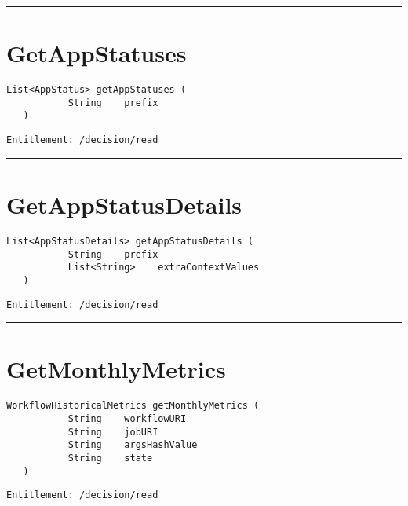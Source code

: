 \rule{12cm}{2pt}
\section{GetAppStatuses}
\label{Api:GetAppStatuses}
\begin{lstlisting}[style=nonumbers]
   List<AppStatus> getAppStatuses (
           String    prefix
   )
\end{lstlisting}
\begin{Verbatim}[formatcom=\color{Maroon}]
  Entitlement: /decision/read
\end{Verbatim}



\rule{12cm}{2pt}
\section{GetAppStatusDetails}
\label{Api:GetAppStatusDetails}
\begin{lstlisting}[style=nonumbers]
   List<AppStatusDetails> getAppStatusDetails (
           String    prefix
           List<String>    extraContextValues
   )
\end{lstlisting}
\begin{Verbatim}[formatcom=\color{Maroon}]
  Entitlement: /decision/read
\end{Verbatim}



\rule{12cm}{2pt}
\section{GetMonthlyMetrics}
\label{Api:GetMonthlyMetrics}
\begin{lstlisting}[style=nonumbers]
   WorkflowHistoricalMetrics getMonthlyMetrics (
           String    workflowURI
           String    jobURI
           String    argsHashValue
           String    state
   )
\end{lstlisting}
\begin{Verbatim}[formatcom=\color{Maroon}]
  Entitlement: /decision/read
\end{Verbatim}



